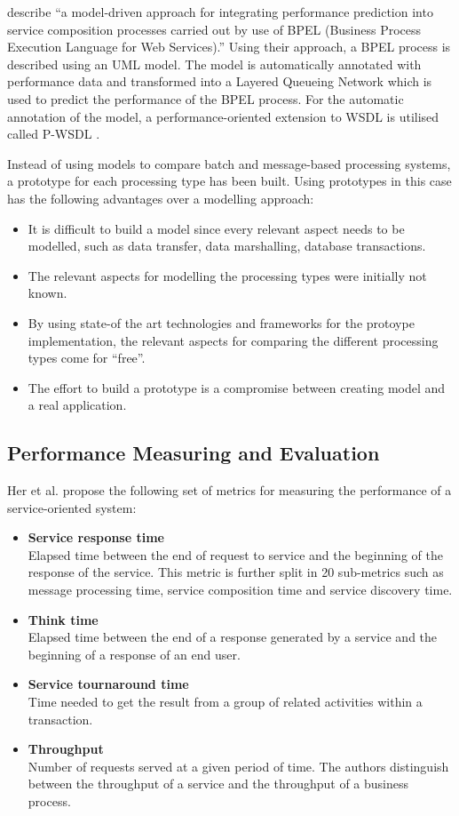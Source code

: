 \citet{DAmbrogio:2007ly} describe ``a model-driven approach for integrating performance prediction into service composition processes carried out by use of BPEL (Business Process Execution Language for Web Services).'' Using their approach, a BPEL process is described using an UML model. The model is automatically annotated with performance data and transformed into a Layered Queueing Network which is used to predict the performance of the BPEL process. For the automatic annotation of the model, a performance-oriented extension to WSDL is utilised called P-WSDL \citep{D-Ambrogio:2005ve}.

Instead of using models to compare batch and message-based processing systems, a prototype for each processing type has been built. Using prototypes in this case has the following advantages over a modelling approach:

\begin{itemize}
	\item It is difficult to build a model since every relevant aspect needs to be modelled, such as data transfer, data marshalling, database transactions.
	\item The relevant aspects for modelling the processing types were initially not known.
	\item By using state-of the art technologies and frameworks for the protoype implementation, the relevant aspects for comparing the different processing types come for ``free''.
	\item The effort to build a prototype is a compromise between creating model and a real application.
\end{itemize}

\subsection{Performance Measuring and Evaluation}
Her et al. \citep{Her:2007qf} propose the following set of metrics for measuring the performance of a service-oriented system:
\begin{itemize}
	\item \textbf{Service response time}\\
	Elapsed time between the end of request to service and the beginning of the response of the service. This metric is further split in 20 sub-metrics such as message processing time, service composition time and service discovery time.
	\item \textbf{Think time}\\
	Elapsed time between the end of a response generated by a service and the beginning of a response of an end user.
	\item \textbf{Service tournaround time}\\
	Time needed to get the result from a group of related activities within a transaction.
	\item \textbf{Throughput}\\
	Number of requests served at a given period of time. The authors distinguish between the throughput of a service and the throughput of a business process.
\end{itemize}

